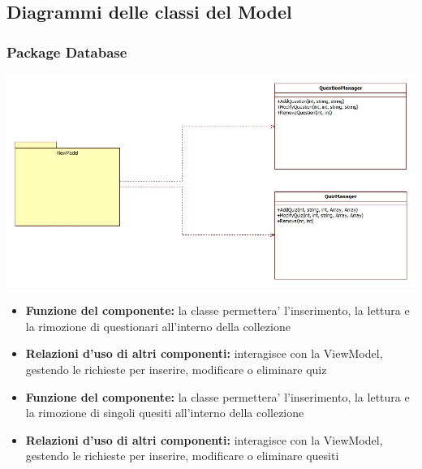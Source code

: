 \subsection{Diagrammi delle classi del Model}
			\subsubsection{Package Database}
			\begin{center}
				\includegraphics[scale=0.5]{../images/Database.jpg}
			\end{center}
			\begin{itemize}
		    	\item\textbf{Funzione del componente:} la classe permettera' l'inserimento, la lettura e la rimozione di questionari all'interno della collezione
			\item\textbf{Relazioni d'uso di altri componenti:} interagisce con la ViewModel, gestendo le richieste per inserire, modificare o eliminare quiz
			\end{itemize}
			\begin{itemize}
		    	\item\textbf{Funzione del componente:} la classe permettera' l'inserimento, la lettura e la rimozione di singoli quesiti all'interno della collezione
			\item\textbf{Relazioni d'uso di altri componenti:} interagisce con la ViewModel, gestendo le richieste per inserire, modificare o eliminare quesiti
			\end{itemize}
			
